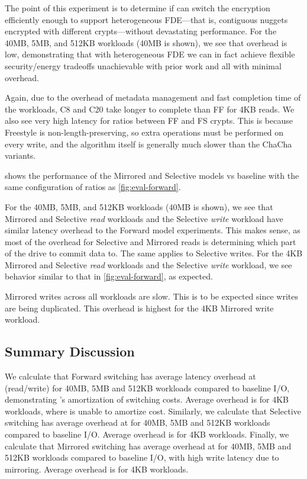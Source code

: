 

The point of this experiment is to determine if \sys can switch the encryption
efficiently enough to support heterogeneous FDE---that is, contiguous nuggets
encrypted with different crypts---without devastating performance. For the 40MB,
5MB, and 512KB workloads (40MB is shown), we see that overhead is low,
demonstrating that with heterogeneous FDE we can in fact achieve flexible
security/energy tradeoffs unachievable with prior work and all with minimal
overhead.

Again, due to the overhead of metadata management and fast completion time of
the workloads, C8 and C20 take longer to complete than FF for 4KB reads. We also
see very high latency for ratios between FF and FS crypts. This is because
Freestyle is non-length-preserving, so extra operations must be performed on
every write, and the algorithm itself is generally much slower than the ChaCha
variants.

 shows the performance of the Mirrored and Selective models vs
baseline with the same configuration of ratios as \cref{fig:eval-forward}.

For the 40MB, 5MB, and 512KB workloads (40MB is shown), we see that Mirrored and
Selective {\em read} workloads and the Selective {\em write} workload have
similar latency overhead to the Forward model experiments. This makes sense, as
most of the overhead for Selective and Mirrored reads is determining which part
of the drive to commit data to. The same applies to Selective writes. For the
4KB Mirrored and Selective {\em read} workloads and the Selective {\em write}
workload, we see behavior similar to that in \cref{fig:eval-forward}, as
expected.

Mirrored writes across all workloads are slow. This is to be expected since
writes are being duplicated. This overhead is highest for the 4KB Mirrored write
workload.


\subsection{Summary Discussion}\label{subsec:eval-overhead}

We calculate that Forward switching has average latency overhead at
 (read/write) for 40MB, 5MB and 512KB workloads compared to
baseline I/O, demonstrating \sys's amortization of switching costs. Average
overhead is  for 4KB workloads, where \sys is unable to amortize
cost. Similarly, we calculate that Selective switching has average overhead at
 for 40MB, 5MB and 512KB workloads compared to baseline I/O.
Average overhead is  for 4KB workloads. Finally, we calculate that
Mirrored switching has average overhead at  for 40MB, 5MB and
512KB workloads compared to baseline I/O, with high write latency due to
mirroring. Average overhead is  for 4KB workloads.

